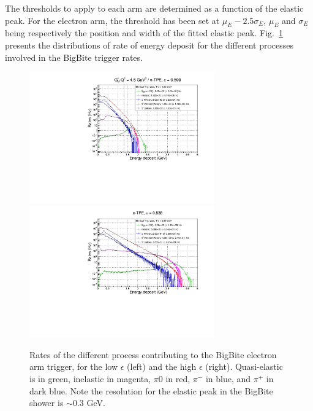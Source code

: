 The thresholds to apply to each arm are determined as a function of the elastic peak.
For the electron arm, the threshold has been set at $\mu_E - 2.5 \sigma_E$,  $\mu_E$ and $\sigma_E$ being respectively the position and width of the fitted elastic peak. 
Fig.~\ref{fig:BBRates} presents the distributions of rate of energy deposit for the different processes involved in the BigBite trigger rates. 

\begin{figure}[!h]
  \centering
    \includegraphics[width=8cm]{Plots/BBECalRates_gen-tpe_le.pdf}
    \includegraphics[width=8cm]{Plots/BBECalRates_gen-tpe_he.pdf}
    \caption{Rates of the different process contributing to the BigBite electron arm trigger, for the low $\epsilon$ (left) and the high $\epsilon$ (right). Quasi-elastic is in green, inelastic in magenta, $\pi0$ in red, $\pi^-$ in blue, and $\pi^+$ in dark blue. Note the resolution for the elastic peak in the BigBite shower is $\sim0.3$ GeV.}
    \label{fig:BBRates}
\end{figure}


